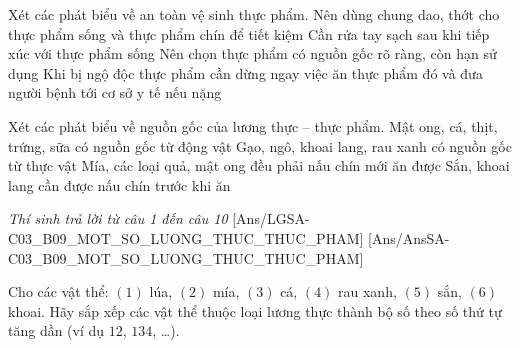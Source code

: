 \documentclass[Main.tex]{subfiles}
\begin{document}
\begin{ex}%
	Xét các phát biểu về an toàn vệ sinh thực phẩm.
	\choiceTF
	{Nên dùng chung dao, thớt cho thực phẩm sống và thực phẩm chín để tiết kiệm}
	{\True Cần rửa tay sạch sau khi tiếp xúc với thực phẩm sống}
	{\True Nên chọn thực phẩm có nguồn gốc rõ ràng, còn hạn sử dụng}
	{\True Khi bị ngộ độc thực phẩm cần dừng ngay việc ăn thực phẩm đó và đưa người bệnh tới cơ sở y tế nếu nặng}
\end{ex}

\begin{ex}%
	Xét các phát biểu về nguồn gốc của lương thực -- thực phẩm.
	\choiceTF
	{\True Mật ong, cá, thịt, trứng, sữa có nguồn gốc từ động vật}
	{\True Gạo, ngô, khoai lang, rau xanh có nguồn gốc từ thực vật}
	{Mía, các loại quả, mật ong đều phải nấu chín mới ăn được}
	{\True Sắn, khoai lang cần được nấu chín trước khi ăn}
\end{ex}

\textit{\large Thí sinh trả lời từ câu 1 đến câu 10}
[Ans/LGSA-C03_B09_MOT_SO_LUONG_THUC_THUC_PHAM]
[Ans/AnsSA-C03_B09_MOT_SO_LUONG_THUC_THUC_PHAM]
\setcounter{ex}{0}

\begin{ex}%
	Cho các vật thể: $(1)$ lúa, $(2)$ mía, $(3)$ cá, $(4)$ rau xanh, $(5)$ sắn, $(6)$ khoai. Hãy sắp xếp các vật thể thuộc loại lương thực thành bộ số theo số thứ tự tăng dần (ví dụ $12$, $134$, …).
\end{ex}
\end{document}
